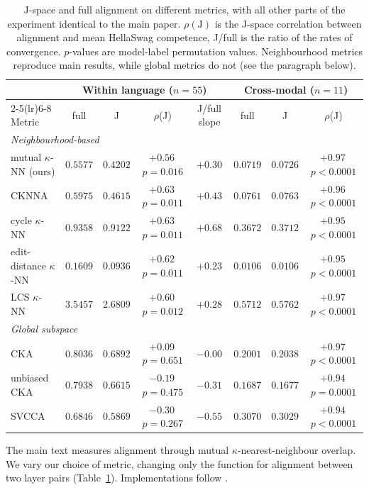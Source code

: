 \documentclass{article}
\begin{document}
\begin{table}[h]
  \centering
  \small
  \setlength{\tabcolsep}{4pt}
  \caption{J-space and full alignment on different metrics, with all other parts of the experiment identical to the main paper. $\rho(\text{J})$ is the J-space correlation between alignment and mean HellaSwag competence, J/full is the ratio of the rates of convergence. $p$-values are model-label permutation values. Neighbourhood metrics reproduce main results, while global metrics do not (see the paragraph below).}
  \label{tab:metricsweep}
  \begin{tabular}{lccccccc}
    \toprule
    & \multicolumn{4}{c}{Within language ($n=55$)} & \multicolumn{3}{c}{Cross-modal ($n=11$)} \\
    \cmidrule(lr){2-5}\cmidrule(lr){6-8}
    Metric & full & J & $\rho$(J) & J/full slope & full & J & $\rho$(J) \\
    \midrule
    \multicolumn{8}{l}{\emph{Neighbourhood-based}} \\
    mutual $\kappa$-NN (ours) & $0.5577$ & $0.4202$ & $+0.56$\,{\tiny$p=0.016$} & $+0.30$ & $0.0719$ & $0.0726$ & $+0.97$\,{\tiny$p<0.0001$} \\
    CKNNA & $0.5975$ & $0.4615$ & $+0.63$\,{\tiny$p=0.011$} & $+0.43$ & $0.0761$ & $0.0763$ & $+0.96$\,{\tiny$p<0.0001$} \\
    cycle $\kappa$-NN & $0.9358$ & $0.9122$ & $+0.63$\,{\tiny$p=0.011$} & $+0.68$ & $0.3672$ & $0.3712$ & $+0.95$\,{\tiny$p<0.0001$} \\
    edit-distance $\kappa$-NN & $0.1609$ & $0.0936$ & $+0.62$\,{\tiny$p=0.011$} & $+0.23$ & $0.0106$ & $0.0106$ & $+0.95$\,{\tiny$p<0.0001$} \\
    LCS $\kappa$-NN & $3.5457$ & $2.6809$ & $+0.60$\,{\tiny$p=0.012$} & $+0.28$ & $0.5712$ & $0.5762$ & $+0.97$\,{\tiny$p<0.0001$} \\
    \midrule
    \multicolumn{8}{l}{\emph{Global subspace}} \\
    CKA & $0.8036$ & $0.6892$ & $+0.09$\,{\tiny$p=0.651$} & $-0.00$ & $0.2001$ & $0.2038$ & $+0.97$\,{\tiny$p<0.0001$} \\
    unbiased CKA & $0.7938$ & $0.6615$ & $-0.19$\,{\tiny$p=0.475$} & $-0.31$ & $0.1687$ & $0.1677$ & $+0.94$\,{\tiny$p=0.0001$} \\
    SVCCA & $0.6846$ & $0.5869$ & $-0.30$\,{\tiny$p=0.267$} & $-0.55$ & $0.3070$ & $0.3029$ & $+0.94$\,{\tiny$p<0.0001$} \\
    \bottomrule
  \end{tabular}
\end{table}
The main text measures alignment through mutual $\kappa$-nearest-neighbour overlap. We vary our choice of metric, changing only the function for alignment between two layer pairs (Table~\ref{tab:metricsweep}). Implementations follow \citet{huh2024platonic}. 
\end{document}
